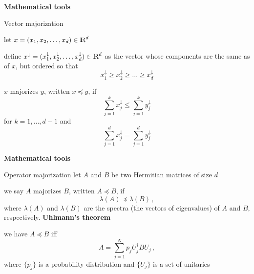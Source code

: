 \documentclass[portrait]{seminar}
\begin{document}
\begin{slide}
{\bf Mathematical tools}

{\blue Vector majorization}

let $x=(x_1,x_2,\ldots,x_d)\in\R^d$

define
$x^\downarrow=(x^\downarrow_1,x^\downarrow_2,\ldots,x^\downarrow_d)\in\R^d$
as the vector whose components are the same as of $x$, but ordered so that
\[
x^\downarrow_1\ge x^\downarrow_2\ge\ldots\ge x^\downarrow_d
\]

{\blue $x$ majorizes $y$}, written {\blue $x\preceq y$}, if
\[
\sum_{j=1}^k x^\downarrow_j \le \sum_{j=1}^k y^\downarrow_j
\]
for $k=1,\ldots,d-1$ and 
\[
\sum_{j=1}^d x^\downarrow_j = \sum_{j=1}^d y^\downarrow_j
\]
\end{slide}

\begin{slide}
{\bf Mathematical tools} 

{\blue Operator majorization}
\vfill
let $A$ and $B$ be two Hermitian matrices of size $d$

we say {\blue $A$ majorizes $B$}, written {\blue $A\preceq B$}, if
\[
\lambda(A)\preceq\lambda(B)\,,
\]
where $\lambda(A)$ and $\lambda(B)$ are the spectra (the vectors of
eigenvalues) of $A$ and $B$, respectively.
\vfill
{\bf Uhlmann's theorem} 

we have $A\preceq B$ iff
\[
A=\sum_{j=1}^N p_j U_j^\dagger B U_j\,,
\]
where $\{p_j\}$ is a probability distribution and $\{U_j\}$ is a set
of unitaries
\vfill
\end{slide}
\end{document}
